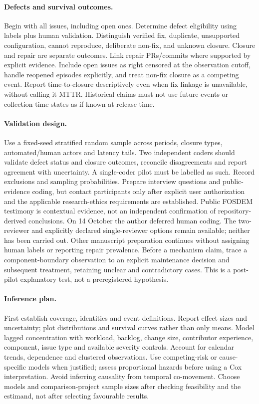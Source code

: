 \documentclass[11pt]{article}
\begin{document}
\paragraph{Defects and survival outcomes.} Begin with all issues, including open
ones. Determine defect eligibility using labels plus human validation. Distinguish
verified fix, duplicate, unsupported configuration, cannot reproduce, deliberate
non-fix, and unknown closure. Closure and repair are separate outcomes. Link repair
PRs/commits where supported by explicit evidence. Include open issues as right
censored at the observation cutoff, handle reopened episodes explicitly, and treat
non-fix closure as a competing event. Report time-to-closure descriptively even
when fix linkage is unavailable, without calling it MTTR. Historical claims must
not use future events or collection-time states as if known at release time.

\paragraph{Validation design.} Use a fixed-seed stratified random sample across
periods, closure types, automated/human actors and latency tails. Two independent
coders should validate defect status and closure outcomes, reconcile disagreements
and report agreement with uncertainty. A single-coder pilot must be labelled as
such. Record exclusions and sampling probabilities. Prepare interview questions
and public-evidence coding, but contact participants only after explicit user
authorization and the applicable research-ethics requirements are established.
Public FOSDEM testimony is contextual evidence, not an independent confirmation
of repository-derived conclusions.
On 14 October the author deferred human coding. The two-reviewer and explicitly
declared single-reviewer options remain available; neither has been carried out.
Other manuscript preparation continues without assigning human labels or
reporting repair prevalence. Before a mechanism claim, trace a component-boundary
observation to an explicit maintenance decision and subsequent treatment, retaining
unclear and contradictory cases. This is a post-pilot explanatory test, not a
preregistered hypothesis.

\paragraph{Inference plan.} First establish coverage, identities and event
definitions. Report effect sizes and uncertainty; plot distributions and survival
curves rather than only means. Model lagged concentration with workload, backlog,
change size, contributor experience, component, issue type and available severity
controls. Account for calendar trends, dependence and clustered observations.
Use competing-risk or cause-specific models when justified; assess proportional
hazards before using a Cox interpretation. Avoid inferring causality from temporal
co-movement. Choose models and comparison-project sample sizes after checking
feasibility and the estimand, not after selecting favourable results.
\end{document}
